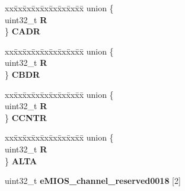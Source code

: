 \begin{DoxyCompactItemize}
\begin{tabbing}
\end{tabbing}\item 
\mbox{\label{structEMIOS__tag_1_1EMIOS__CH__tag_aee4ddf2919e05e67464666ffbf29d0a7}} 
\begin{tabbing}
xx\=xx\=xx\=xx\=xx\=xx\=xx\=xx\=xx\=\kill
union \{\\
\>uint32\_t {\bfseries R}\\
\} {\bfseries CADR}\\

\end{tabbing}\item 
\mbox{\label{structEMIOS__tag_1_1EMIOS__CH__tag_a057c7a1b19e7efd189827304bb352599}} 
\begin{tabbing}
xx\=xx\=xx\=xx\=xx\=xx\=xx\=xx\=xx\=\kill
union \{\\
\>uint32\_t {\bfseries R}\\
\} {\bfseries CBDR}\\

\end{tabbing}\item 
\mbox{\label{structEMIOS__tag_1_1EMIOS__CH__tag_aeb54856bdc3cb1185fc7a63e10c28894}} 
\begin{tabbing}
xx\=xx\=xx\=xx\=xx\=xx\=xx\=xx\=xx\=\kill
union \{\\
\>uint32\_t {\bfseries R}\\
\} {\bfseries CCNTR}\\

\end{tabbing}\item 
\mbox{\label{structEMIOS__tag_1_1EMIOS__CH__tag_a3de87f988ed7629db9c908d7442d9d15}} 
\begin{tabbing}
xx\=xx\=xx\=xx\=xx\=xx\=xx\=xx\=xx\=\kill
union \{\\
\>uint32\_t {\bfseries R}\\
\} {\bfseries ALTA}\\

\end{tabbing}\item 
\mbox{\label{structEMIOS__tag_1_1EMIOS__CH__tag_a0b9841f8fa3013b0b2554189104281ab}} 
uint32\+\_\+t {\bfseries e\+M\+I\+O\+S\+\_\+channel\+\_\+reserved0018} \mbox{[}2\mbox{]}
\end{DoxyCompactItemize}


